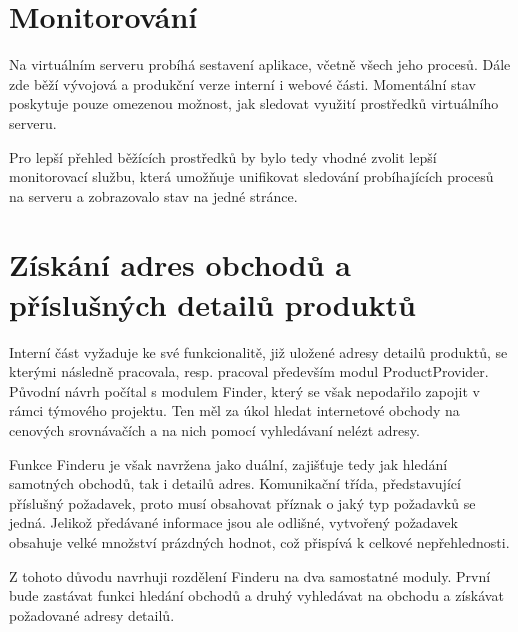 \documentclass[thesis=B,czech]{FITthesis}[2012/06/26]
\begin{document}
\section{Monitorování}
Na virtuálním serveru probíhá sestavení aplikace, včetně všech jeho procesů. Dále zde běží vývojová a produkční verze interní i webové části.
Momentální stav poskytuje pouze omezenou možnost, jak sledovat využití prostředků virtuálního serveru.
\par
Pro lepší přehled běžících prostředků by bylo tedy vhodné zvolit lepší monitorovací službu, která umožňuje unifikovat sledování
probíhajících procesů na serveru a zobrazovalo stav na jedné stránce.

\section{Získání adres obchodů a příslušných detailů produktů}
Interní část vyžaduje ke své funkcionalitě, již uložené adresy detailů produktů, se kterými následně pracovala, resp. pracoval
především modul ProductProvider. Původní návrh počítal s modulem Finder, který se však nepodařilo zapojit v rámci týmového projektu. Ten 
měl za úkol hledat internetové obchody na cenových srovnávačích a na nich pomocí vyhledávaní nelézt adresy.
\par
Funkce Finderu je však navržena jako duální, zajišťuje tedy jak hledání samotných obchodů, tak i detailů adres. Komunikační třída, představující příslušný požadavek, proto musí obsahovat příznak o jaký typ požadavků se jedná. Jelikož předávané informace
jsou ale odlišné, vytvořený požadavek obsahuje velké množství prázdných hodnot, což přispívá k celkové nepřehlednosti.
\par
Z tohoto důvodu navrhuji rozdělení Finderu na dva samostatné moduly. První bude zastávat funkci hledání obchodů a druhý
vyhledávat na obchodu a získávat požadované adresy detailů.
\end{document}
